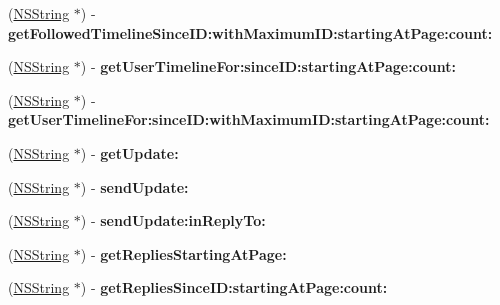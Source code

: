 \begin{DoxyCompactItemize}
\item 
\hypertarget{interface_m_g_twitter_engine_a34c0ba6dea70bb23981e638c04892298}{
(\hyperlink{class_n_s_string}{\-N\-S\-String} $\ast$) -\/ {\bfseries get\-Followed\-Timeline\-Since\-I\-D\-:with\-Maximum\-I\-D\-:starting\-At\-Page\-:count\-:}}
\label{interface_m_g_twitter_engine_a34c0ba6dea70bb23981e638c04892298}

\item 
\hypertarget{interface_m_g_twitter_engine_a54684be9ec4e9eedf6e501824b986b20}{
(\hyperlink{class_n_s_string}{\-N\-S\-String} $\ast$) -\/ {\bfseries get\-User\-Timeline\-For\-:since\-I\-D\-:starting\-At\-Page\-:count\-:}}
\label{interface_m_g_twitter_engine_a54684be9ec4e9eedf6e501824b986b20}

\item 
\hypertarget{interface_m_g_twitter_engine_abc3afd27a25718d85c971168a395917e}{
(\hyperlink{class_n_s_string}{\-N\-S\-String} $\ast$) -\/ {\bfseries get\-User\-Timeline\-For\-:since\-I\-D\-:with\-Maximum\-I\-D\-:starting\-At\-Page\-:count\-:}}
\label{interface_m_g_twitter_engine_abc3afd27a25718d85c971168a395917e}

\item 
\hypertarget{interface_m_g_twitter_engine_a6e76154597c9aa014d2312e3ffbc191a}{
(\hyperlink{class_n_s_string}{\-N\-S\-String} $\ast$) -\/ {\bfseries get\-Update\-:}}
\label{interface_m_g_twitter_engine_a6e76154597c9aa014d2312e3ffbc191a}

\item 
\hypertarget{interface_m_g_twitter_engine_afec750c02977315eb3e938aacadcb6cd}{
(\hyperlink{class_n_s_string}{\-N\-S\-String} $\ast$) -\/ {\bfseries send\-Update\-:}}
\label{interface_m_g_twitter_engine_afec750c02977315eb3e938aacadcb6cd}

\item 
\hypertarget{interface_m_g_twitter_engine_a2b93cebbb4800a9b57cd9917e67a08e5}{
(\hyperlink{class_n_s_string}{\-N\-S\-String} $\ast$) -\/ {\bfseries send\-Update\-:in\-Reply\-To\-:}}
\label{interface_m_g_twitter_engine_a2b93cebbb4800a9b57cd9917e67a08e5}

\item 
\hypertarget{interface_m_g_twitter_engine_a2a34493b9e5aaae1e50eadfc2d250cd7}{
(\hyperlink{class_n_s_string}{\-N\-S\-String} $\ast$) -\/ {\bfseries get\-Replies\-Starting\-At\-Page\-:}}
\label{interface_m_g_twitter_engine_a2a34493b9e5aaae1e50eadfc2d250cd7}

\item 
\hypertarget{interface_m_g_twitter_engine_a6993baa657462b92541e9a841d0af0ba}{
(\hyperlink{class_n_s_string}{\-N\-S\-String} $\ast$) -\/ {\bfseries get\-Replies\-Since\-I\-D\-:starting\-At\-Page\-:count\-:}}
\label{interface_m_g_twitter_engine_a6993baa657462b92541e9a841d0af0ba}


\end{DoxyCompactItemize}
